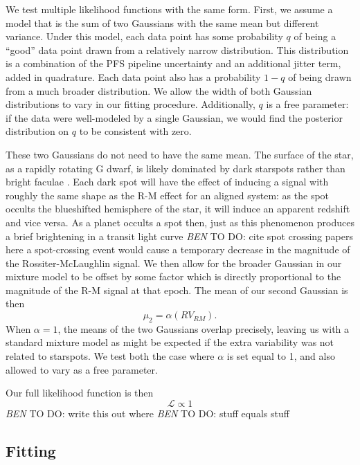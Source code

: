 \documentclass[twocolumn]{aastex62}
\newcommand{\todo}[3]{{\color{#2} \emph{#1} TO DO: #3}}
\newcommand{\btmtodo}[1]{\todo{BEN}{blue}{#1}}
\begin{document}
We test multiple likelihood functions with the same form.
First, we assume a model that is the sum of two Gaussians with the same mean but different variance. 
Under this model, each data point has some probability $q$ of being a ``good'' data point drawn from a relatively narrow distribution. This distribution is a combination of the PFS pipeline uncertainty and an additional jitter term, added in quadrature. 
Each data point also has a probability $1-q$ of being drawn from a much broader distribution. We allow the width of both Gaussian distributions to vary in our fitting procedure. 
Additionally, $q$ is a free parameter: if the data were well-modeled by a single Gaussian, we would find the posterior distribution on $q$ to be consistent with zero.

These two Gaussians do not need to have the same mean. 
The surface of the star, as a rapidly rotating G dwarf, is likely dominated by dark starspots rather than bright faculae \citep{Montet17}. 
Each dark spot will have the effect of inducing a signal with roughly the same shape as the R-M effect for an aligned system: as the spot occults the blueshifted hemisphere of the star, it will induce an apparent redshift and vice versa.
As a planet occults a spot then, just as this phenomenon produces a brief brightening in a transit light curve \btmtodo{cite spot crossing papers here} a spot-crossing event would cause a temporary decrease in the magnitude of the Rossiter-McLaughlin signal. 
We then allow for the broader Gaussian in our mixture model to be offset by some factor which is directly proportional to the magnitude of the R-M signal at that epoch. The mean of our second Gaussian is then
\begin{equation}
\mu_2 = \alpha (RV_{RM}).
\end{equation}
When $\alpha = 1$, the means of the two Gaussians overlap precisely, leaving us with a standard mixture model as might be expected if the extra variability was not related to starspots. 
We test both the case where $\alpha$ is set equal to 1, and also allowed to vary as a free parameter.

Our full likelihood function is then
\begin{equation}
\mathcal{L} \propto 1	
\end{equation}
\btmtodo{write this out}
where \btmtodo{stuff equals stuff}

\subsection{Fitting}
\end{document}
